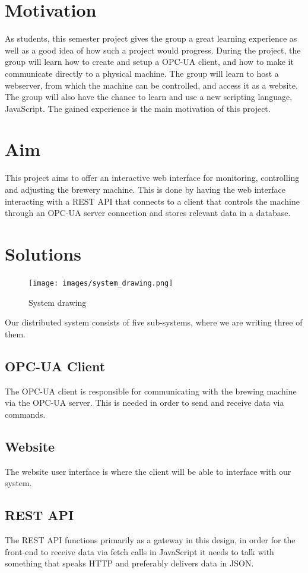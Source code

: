 \section{Motivation}
As students,
this semester project gives the group a great learning experience as well as a good idea of how such a project would progress.
During the project, the group will learn how to create and setup a OPC-UA client,
and how to make it communicate directly to a physical machine.
The group will learn to host a webserver, from which the machine can be controlled,
and access it as a website.
The group will also have the chance to learn and use a new scripting language, JavaScript.
The gained experience is the main motivation of this project.

\section{Aim}
This project aims to offer an interactive web interface for monitoring,
controlling and adjusting the brewery machine. This is done by having the web
interface interacting with a REST API that connects to a client that controls
the machine through an OPC-UA server connection and stores relevant data in a 
database.

\section{Solutions}
\begin{figure}[h]
\centering 
\texttt{[image: images/system\_drawing.png]}
\label{figure:system_drawing}
\caption{System drawing} 
\end{figure}

Our distributed system consists of five sub-systems, where we are writing three
of them.

\subsection{OPC-UA Client}
The OPC-UA client is responsible for communicating with the brewing machine via
the OPC-UA server. This is needed in order to send and receive data via
commands.

\subsection{Website}
The website user interface is where the client will be able to interface with
our system.

\subsection{REST API}
The REST API functions primarily as a gateway in this design, in order for the
front-end to receive data via fetch calls in JavaScript it needs to talk with
something that speaks HTTP and preferably delivers data in JSON.

